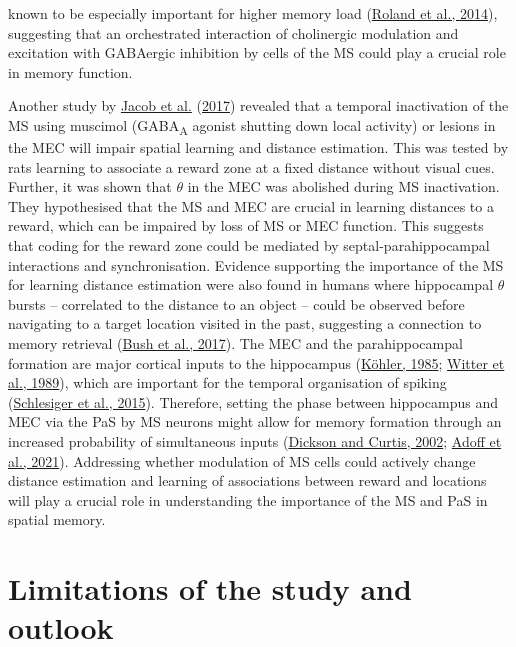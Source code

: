 \documentclass[
  12pt,
  a4paper,
  openany]{book}
\begin{document}
known to be especially important for higher memory load (\protect\hyperlink{ref-roland_medial_2014}{Roland et al., 2014}), suggesting that an orchestrated interaction of cholinergic modulation and excitation with GABAergic inhibition by cells of the MS could play a crucial role in memory function.

Another study by \protect\hyperlink{ref-jacob_medial_2017}{Jacob et al.} (\protect\hyperlink{ref-jacob_medial_2017}{2017}) revealed that a temporal inactivation of the MS using muscimol (GABA\textsubscript{A} agonist shutting down local activity) or lesions in the MEC will impair spatial learning and distance estimation. This was tested by rats learning to associate a reward zone at a fixed distance without visual cues. Further, it was shown that \(\theta\) in the MEC was abolished during MS inactivation. They hypothesised that the MS and MEC are crucial in learning distances to a reward, which can be impaired by loss of MS or MEC function. This suggests that coding for the reward zone could be mediated by septal-parahippocampal interactions and synchronisation. Evidence supporting the importance of the MS for learning distance estimation were also found in humans where hippocampal \(\theta\) bursts -- correlated to the distance to an object -- could be observed before navigating to a target location visited in the past, suggesting a connection to memory retrieval (\protect\hyperlink{ref-bush_human_2017}{Bush et al., 2017}). The MEC and the parahippocampal formation are major cortical inputs to the hippocampus (\protect\hyperlink{ref-kohler_intrinsic_1985}{Köhler, 1985}; \protect\hyperlink{ref-witter_topographical_1989}{Witter et al., 1989}), which are important for the temporal organisation of spiking (\protect\hyperlink{ref-schlesiger_medial_2015}{Schlesiger et al., 2015}). Therefore, setting the phase between hippocampus and MEC via the PaS by MS neurons might allow for memory formation through an increased probability of simultaneous inputs (\protect\hyperlink{ref-dickson_enhancement_2002}{Dickson and Curtis, 2002}; \protect\hyperlink{ref-adoff_functional_2021}{Adoff et al., 2021}). Addressing whether modulation of MS cells could actively change distance estimation and learning of associations between reward and locations will play a crucial role in understanding the importance of the MS and PaS in spatial memory.

\hypertarget{limitations-of-the-study-and-outlook}{%
\section{Limitations of the study and outlook}\label{limitations-of-the-study-and-outlook}}
\end{document}
